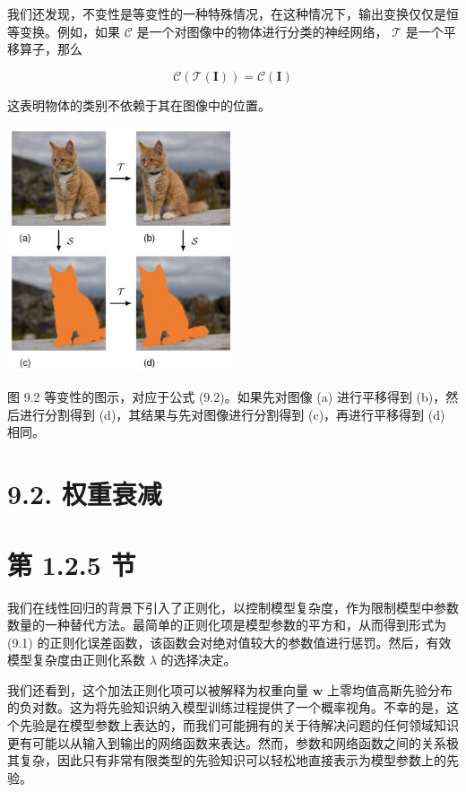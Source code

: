\documentclass[10pt]{article}
\begin{document}
我们还发现，不变性是等变性的一种特殊情况，在这种情况下，输出变换仅仅是恒等变换。例如，如果 \(\mathcal{C}\) 是一个对图像中的物体进行分类的神经网络， \(\mathcal{T}\) 是一个平移算子，那么

\[
\mathcal{C}\left( {\mathcal{T}\left( \mathbf{I}\right) }\right)  = \mathcal{C}\left( \mathbf{I}\right)  \tag{9.4}
\]

这表明物体的类别不依赖于其在图像中的位置。

\begin{center}
\includegraphics[max width=0.5\textwidth]{images/0194e279-9b28-703a-88f4-c3ac21e2010d_279_886_354_652_707_0.jpg}
\end{center}
\hspace*{3em} 

图 9.2 等变性的图示，对应于公式 (9.2)。如果先对图像 (a) 进行平移得到 (b)，然后进行分割得到 (d)，其结果与先对图像进行分割得到 (c)，再进行平移得到 (d) 相同。

\section*{9.2. 权重衰减}

\section*{第 1.2.5 节}

我们在线性回归的背景下引入了正则化，以控制模型复杂度，作为限制模型中参数数量的一种替代方法。最简单的正则化项是模型参数的平方和，从而得到形式为 (9.1) 的正则化误差函数，该函数会对绝对值较大的参数值进行惩罚。然后，有效模型复杂度由正则化系数 \(\lambda\) 的选择决定。

我们还看到，这个加法正则化项可以被解释为权重向量 \(\mathbf{w}\) 上零均值高斯先验分布的负对数。这为将先验知识纳入模型训练过程提供了一个概率视角。不幸的是，这个先验是在模型参数上表达的，而我们可能拥有的关于待解决问题的任何领域知识更有可能以从输入到输出的网络函数来表达。然而，参数和网络函数之间的关系极其复杂，因此只有非常有限类型的先验知识可以轻松地直接表示为模型参数上的先验。
\end{document}
